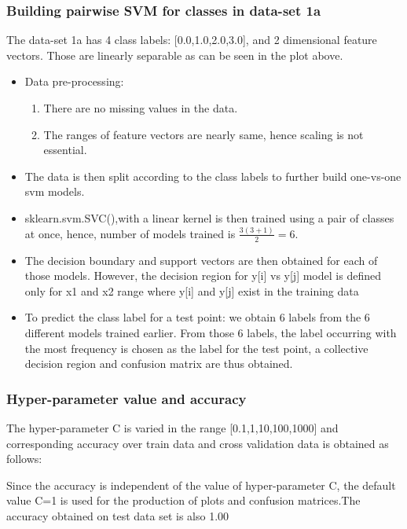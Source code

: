 \documentclass[11pt,a4paper]{article}
\newcommand{\noi}{\noindent}
\begin{document}
\subsubsection{Building pairwise SVM for classes in data-set 1a}
The data-set 1a has 4 class labels: [0.0,1.0,2.0,3.0], and 2 dimensional feature vectors. Those are linearly separable as can be seen in the plot above.
\begin{itemize}
    \item Data pre-processing:
    \begin{enumerate}
        \item There are no missing values in the data.
        \item The ranges of feature vectors are nearly same, hence scaling is not essential. 
    \end{enumerate}
    \item The data is then split according to the class labels to further build one-vs-one svm models.
    \item sklearn.svm.SVC(),with a linear kernel is then trained using a pair of classes at once, hence, number of models trained is $\frac{3(3+1)}{2}=6$. 
    \item The decision boundary and support vectors are then obtained for each of those models. However, the decision region for y[i] vs y[j] model is defined only for x1 and x2 range where y[i] and y[j] exist in the training data
    \item To predict the class label for a test point: we obtain 6 labels from the 6 different models trained earlier. From those 6 labels, the label occurring with the most frequency is chosen as the label for the test point, a collective decision region and confusion matrix are thus obtained.
\end{itemize}

\subsubsection{Hyper-parameter value and accuracy}
The hyper-parameter C is varied in the range [0.1,1,10,100,1000] and corresponding accuracy over train data and cross validation data is obtained as follows: 


\noi
Since the accuracy is independent of the value of hyper-parameter C, the default value C=1 is used for the production of plots and confusion matrices.The accuracy obtained on test data set is also 1.00 
\noi
\end{document}
